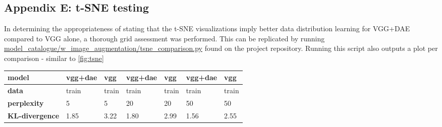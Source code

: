 \subsection*{Appendix E: t-SNE testing} \label{appendix: E}

In determining the appropriateness of stating that the t-SNE visualizations imply better data distribution learning for VGG+DAE compared to VGG alone, a thorough grid assessment was performed.
This can be replicated by running \url{model_catalogue/w_image_augmentation/tsne_comparison.py} found on the project repository.
Running this script also outputs a plot per comparison - similar to \autoref{fig:tsne}

\begin{table}[H]
    \begin{tabular}{@{}lllllll@{}}
    \toprule
    \textbf{model}         & vgg+dae & vgg   & vgg+dae & vgg   & vgg+dae & vgg   \\ \midrule
    \textbf{data}          & train   & train & train   & train & train   & train \\
    \textbf{perplexity}    & 5       & 5     & 20      & 20    & 50      & 50    \\
    \textbf{KL-divergence} & 1.85    & 3.22  & 1.80    & 2.99  & 1.56    & 2.55  \\ \bottomrule
    \end{tabular}
    \label{t-SNE comparison for training data}
\end{table}